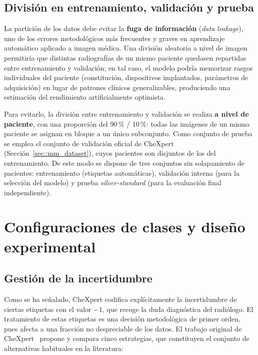 \subsection{División en entrenamiento, validación y prueba}

La partición de los datos debe evitar la \textbf{fuga de información}
(\textit{data leakage}), uno de los errores metodológicos más frecuentes y
graves en aprendizaje automático aplicado a imagen médica. Una división aleatoria
a nivel de imagen permitiría que distintas radiografías de un mismo paciente
quedasen repartidas entre entrenamiento y validación; en tal caso, el modelo
podría memorizar rasgos individuales del paciente (constitución, dispositivos
implantados, parámetros de adquisición) en lugar de patrones clínicos
generalizables, produciendo una estimación del rendimiento artificialmente
optimista.

Para evitarlo, la división entre entrenamiento y validación se realiza \textbf{a
nivel de paciente}, con una proporción del 90\,\% / 10\,\%: todas las imágenes de
un mismo paciente se asignan en bloque a un único subconjunto. Como conjunto de
prueba se emplea el conjunto de validación oficial de CheXpert
(Sección~\ref{sec::mm_dataset}), cuyos pacientes son disjuntos de los del
entrenamiento. De este modo se dispone de tres conjuntos sin solapamiento de
pacientes: entrenamiento (etiquetas automáticas), validación interna (para la
selección del modelo) y prueba \textit{silver-standard} (para la evaluación
final independiente).


\section{Configuraciones de clases y diseño experimental}
\label{sec::mm_clases}

\subsection{Gestión de la incertidumbre}
\label{sec::mm_incertidumbre}

Como se ha señalado, CheXpert codifica explícitamente la incertidumbre de ciertas
etiquetas con el valor $-1$, que recoge la duda diagnóstica del radiólogo. El
tratamiento de estas etiquetas es una decisión metodológica de primer orden, pues
afecta a una fracción no despreciable de los datos. El trabajo original de
CheXpert~\cite{irvinCheXpertLargeChest2019} propone y compara cinco estrategias,
que constituyen el conjunto de alternativas habituales en la literatura:

